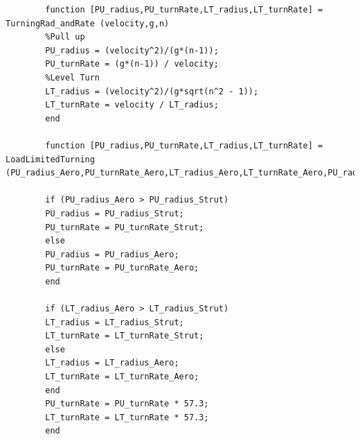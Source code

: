 \documentclass[12pt,A4paper]{article}
\begin{document}
\begin{lstlisting}
		function [PU_radius,PU_turnRate,LT_radius,LT_turnRate] = TurningRad_andRate (velocity,g,n)
		%Pull up 
		PU_radius = (velocity^2)/(g*(n-1));
		PU_turnRate = (g*(n-1)) / velocity;
		%Level Turn
		LT_radius = (velocity^2)/(g*sqrt(n^2 - 1));
		LT_turnRate = velocity / LT_radius;
		end
		
		function [PU_radius,PU_turnRate,LT_radius,LT_turnRate] = LoadLimitedTurning (PU_radius_Aero,PU_turnRate_Aero,LT_radius_Aero,LT_turnRate_Aero,PU_radius_Strut,PU_turnRate_Strut,LT_radius_Strut,LT_turnRate_Strut)
		
		if (PU_radius_Aero > PU_radius_Strut)
		PU_radius = PU_radius_Strut;
		PU_turnRate = PU_turnRate_Strut;
		else
		PU_radius = PU_radius_Aero;
		PU_turnRate = PU_turnRate_Aero;
		end
		
		if (LT_radius_Aero > LT_radius_Strut)
		LT_radius = LT_radius_Strut;
		LT_turnRate = LT_turnRate_Strut;
		else
		LT_radius = LT_radius_Aero;
		LT_turnRate = LT_turnRate_Aero;
		end
		PU_turnRate = PU_turnRate * 57.3;
		LT_turnRate = LT_turnRate * 57.3;
		end
		
	\end{lstlisting}
	
\end{document}
